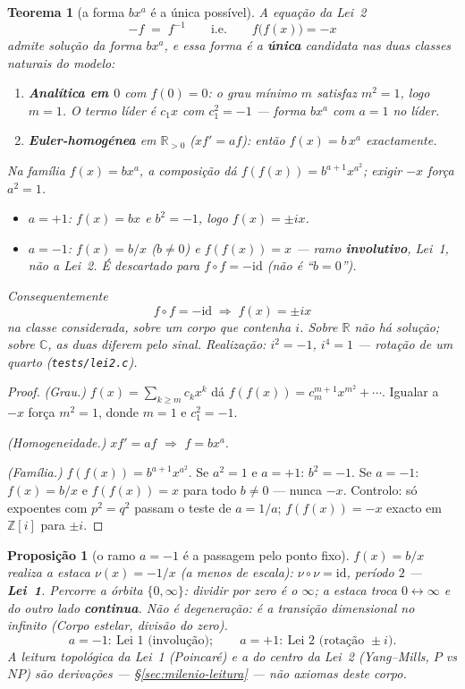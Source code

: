 \documentclass[11pt,a4paper]{article}
\newtheorem{teorema}{Teorema}
\newtheorem{proposicao}{Proposição}
\newcommand{\code}[1]{\texttt{#1}}
\begin{document}
\begin{teorema}[a forma $bx^{a}$ é a única possível]\label{thm:forma-unica}
A equação da Lei~2
\[
-f \;=\; f^{-1}
\qquad\text{i.e.}\qquad
f\bigl(f(x)\bigr)=-x
\]
admite solução da forma $bx^{a}$, e essa forma é a \textbf{única} candidata
nas duas classes naturais do modelo:
\begin{enumerate}
\item \textbf{Analítica em $0$} com $f(0)=0$: o grau mínimo $m$
satisfaz $m^{2}=1$, logo $m=1$. O termo líder é $c_1 x$ com
$c_1^{2}=-1$ --- forma $bx^{a}$ com $a=1$ no líder.
\item \textbf{Euler-homogénea} em $\mathbb{R}_{>0}$ ($xf'=af$):
então $f(x)=b\,x^{a}$ exactamente.
\end{enumerate}
Na família $f(x)=bx^{a}$, a composição dá
$f(f(x))=b^{a+1}x^{a^{2}}$; exigir $-x$ força $a^{2}=1$.
\begin{itemize}
\item $a=+1$: $f(x)=bx$ e $b^{2}=-1$, logo
$\boxed{f(x)=\pm ix}$.
\item $a=-1$: $f(x)=b/x$ ($b\neq0$) e
$f(f(x))=x$ --- ramo \textbf{involutivo}, Lei~1, não a Lei~2.
É descartado para $f\circ f=-\mathrm{id}$ (não é ``$b=0$'').
\end{itemize}
Consequentemente
\[
\boxed{f\circ f=-\mathrm{id}
\;\Longrightarrow\;
f(x)=\pm ix}
\]
na classe considerada, sobre um corpo que contenha $i$.
Sobre $\mathbb{R}$ não há solução; sobre $\mathbb{C}$, as duas diferem
pelo sinal. Realização: $i^{2}=-1$, $i^{4}=1$ --- rotação de um quarto
(\code{tests/lei2.c}).
\end{teorema}

\begin{proof}
\textit{(Grau.)} $f(x)=\sum_{k\geq m}c_k x^{k}$ dá
$f(f(x))=c_m^{m+1}x^{m^{2}}+\cdots$. Igualar a $-x$ força $m^{2}=1$,
donde $m=1$ e $c_1^{2}=-1$.

\textit{(Homogeneidade.)} $xf'=af$ $\Rightarrow$ $f=bx^{a}$.

\textit{(Família.)} $f(f(x))=b^{a+1}x^{a^{2}}$. Se $a^{2}=1$ e $a=+1$:
$b^{2}=-1$. Se $a=-1$: $f(x)=b/x$ e $f(f(x))=x$ para todo $b\neq0$
--- nunca $-x$. Controlo: só expoentes com $p^{2}=q^{2}$ passam o
teste de $a=1/a$; $f(f(x))=-x$ exacto em $\mathbb{Z}[i]$ para
$\pm i$.
\end{proof}

\begin{proposicao}[o ramo $a=-1$ é a passagem pelo ponto fixo]\label{prop:a-1}
$f(x)=b/x$ realiza a estaca $\nu(x)=-1/x$ (a menos de escala):
$\nu\circ\nu=\mathrm{id}$, período $2$ --- \textbf{Lei~1}. Percorre a
órbita $\{0,\infty\}$: dividir \emph{por} zero é o $\infty$; a estaca
troca $0\leftrightarrow\infty$ e do outro lado \textbf{continua}.
Não é degeneração: é a transição dimensional no infinito
(\emph{Corpo estelar}, divisão do zero).
\[
\boxed{
a=-1:\ \text{Lei~1 (involução)};
\qquad
a=+1:\ \text{Lei~2 (rotação }\pm i\text{)}.
}
\]
A leitura topológica da Lei~1 (Poincaré) e a do centro da Lei~2
(Yang--Mills, $P$ vs $NP$) são derivações --- \S\ref{sec:milenio-leitura}
--- não axiomas deste corpo.
\end{proposicao}
\end{document}

